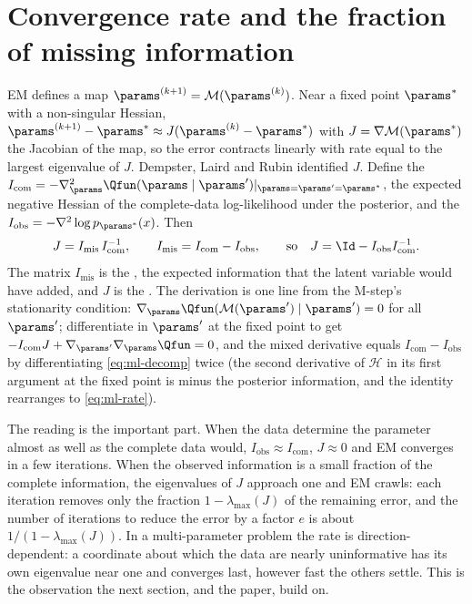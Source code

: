 \section{Convergence rate and the fraction of missing information}

EM defines a map $\params^{(k+1)}=\mathcal M(\params^{(k)})$. Near a fixed point $\params^\ast$
with a non-singular Hessian, $\params^{(k+1)}-\params^\ast\approx J(\params^{(k)}-\params^\ast)$
with $J=\nabla\mathcal M(\params^\ast)$ the Jacobian of the map, so the error contracts
linearly with rate equal to the largest eigenvalue of $J$. Dempster, Laird and Rubin
identified $J$. Define the 
$I_{\mathrm{com}}=-\nabla^2_\params\Qfun(\params\mid\params')|_{\params=\params'=\params^\ast}$,
the expected negative Hessian of the complete-data log-likelihood under the posterior,
and the  $I_{\mathrm{obs}}=-\nabla^2\log p_{\params^\ast}(x)$. Then
\begin{equation}
  J=I_{\mathrm{mis}}\,I_{\mathrm{com}}^{-1},\qquad I_{\mathrm{mis}}=I_{\mathrm{com}}-I_{\mathrm{obs}},
  \qquad\text{so}\quad J=\Id-I_{\mathrm{obs}}I_{\mathrm{com}}^{-1}.
  \label{eq:ml-rate}
\end{equation}
The matrix $I_{\mathrm{mis}}$ is the , the expected information
that the latent variable would have added, and $J$ is the . The derivation is one line from the M-step's stationarity condition:
$\nabla_\params\Qfun(\mathcal M(\params')\mid\params')=0$ for all $\params'$; differentiate
in $\params'$ at the fixed point to get
$-I_{\mathrm{com}}J+\nabla_{\params'}\nabla_\params\Qfun=0$, and the mixed derivative equals
$I_{\mathrm{com}}-I_{\mathrm{obs}}$ by differentiating \cref{eq:ml-decomp} twice (the
second derivative of $\mathcal H$ in its first argument at the fixed point is minus the
posterior information, and the identity rearranges to \cref{eq:ml-rate}).

The reading is the important part. When the data determine the parameter almost as
well as the complete data would, $I_{\mathrm{obs}}\approx I_{\mathrm{com}}$, $J\approx0$ and
EM converges in a few iterations. When the observed information is a small fraction of
the complete information, the eigenvalues of $J$ approach one and EM crawls: each
iteration removes only the fraction $1-\lambda_{\max}(J)$ of the remaining error, and
the number of iterations to reduce the error by a factor $e$ is about
$1/(1-\lambda_{\max}(J))$. In a multi-parameter problem the rate is direction-dependent:
a coordinate about which the data are nearly uninformative has its own eigenvalue
near one and converges last, however fast the others settle. This is the observation
the next section, and the paper, build on.

